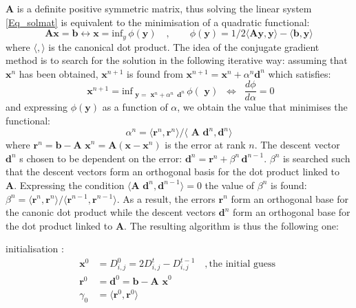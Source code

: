 \documentclass[NEMO_book]{subfiles}
\begin{document}
\textbf{A} is a definite positive symmetric matrix, thus solving the linear 
system \eqref{Eq_solmat} is equivalent to the minimisation of a quadratic 
functional:
\begin{equation*}
\textbf{Ax} = \textbf{b} \leftrightarrow \textbf{x} =\text{inf}_{y} \,\phi (\textbf{y})
\quad , \qquad
\phi (\textbf{y}) = 1/2 \langle \textbf{Ay},\textbf{y}\rangle - \langle \textbf{b},\textbf{y} \rangle 
\end{equation*}
where $\langle , \rangle$ is the canonical dot product. The idea of the 
conjugate gradient method is to search for the solution in the following 
iterative way: assuming that $\textbf{x}^n$ has been obtained, $\textbf{x}^{n+1}$ 
is found from $\textbf {x}^{n+1}={\textbf {x}}^n+\alpha^n{\textbf {d}}^n$ which satisfies:
\begin{equation*}
{\textbf{ x}}^{n+1}=\text{inf} _{{\textbf{ y}}={\textbf{ x}}^n+\alpha^n \,{\textbf{ d}}^n} \,\phi ({\textbf{ y}})\;\;\Leftrightarrow \;\;\frac{d\phi }{d\alpha}=0
\end{equation*}
and expressing $\phi (\textbf{y})$ as a function of \textit{$\alpha $}, we obtain the 
value that minimises the functional: 
\begin{equation*}
\alpha ^n = \langle{ \textbf{r}^n , \textbf{r}^n} \rangle  / \langle {\textbf{ A d}^n, \textbf{d}^n} \rangle
\end{equation*}
where $\textbf{r}^n = \textbf{b}-\textbf{A x}^n = \textbf{A} (\textbf{x}-\textbf{x}^n)$ 
is the error at rank $n$. The descent vector $\textbf{d}^n$ s chosen to be dependent 
on the error: $\textbf{d}^n = \textbf{r}^n + \beta^n \,\textbf{d}^{n-1}$. $\beta ^n$ 
is searched such that the descent vectors form an orthogonal basis for the dot 
product linked to \textbf{A}. Expressing the condition 
$\langle \textbf{A d}^n, \textbf{d}^{n-1} \rangle = 0$ the value of $\beta ^n$ is found:
 $\beta ^n = \langle{ \textbf{r}^n , \textbf{r}^n} \rangle  / \langle {\textbf{r}^{n-1}, \textbf{r}^{n-1}} \rangle$. 
 As a result, the errors $ \textbf{r}^n$ form an orthogonal 
base for the canonic dot product while the descent vectors $\textbf{d}^n$ form 
an orthogonal base for the dot product linked to \textbf{A}. The resulting 
algorithm is thus the following one:

initialisation :
\begin{equation*} 
\begin{split}
\textbf{x}^0 &= D_{i,j}^0   = 2 D_{i,j}^t - D_{i,j}^{t-1}       \quad, \text{the initial guess }     \\
\textbf{r}^0 &= \textbf{d}^0 = \textbf{b} - \textbf{A x}^0       \\
\gamma_0 &= \langle{ \textbf{r}^0 , \textbf{r}^0} \rangle
\end{split}
\end{equation*}
\end{document}
